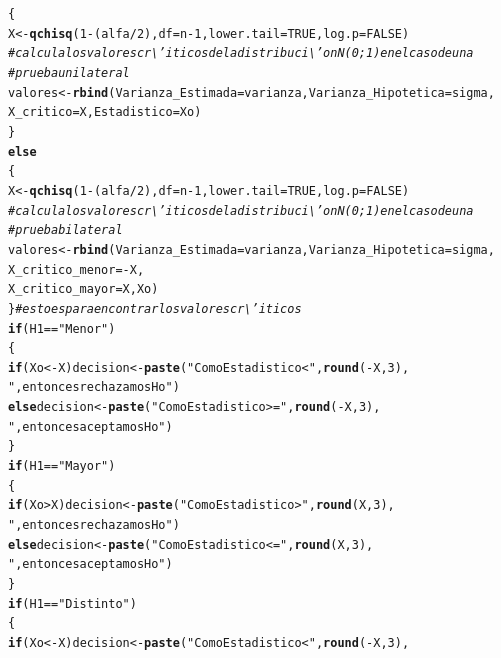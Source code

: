 \documentclass[12pt,letterpaper]{article}\usepackage[]{graphicx}\usepackage[]{color}
\makeatletter
\newcommand{\hlnum}[1]{\textcolor[rgb]{0.686,0.059,0.569}{#1}}%
\newcommand{\hlstr}[1]{\textcolor[rgb]{0.192,0.494,0.8}{#1}}%
\newcommand{\hlcom}[1]{\textcolor[rgb]{0.678,0.584,0.686}{\textit{#1}}}%
\newcommand{\hlopt}[1]{\textcolor[rgb]{0,0,0}{#1}}%
\newcommand{\hlstd}[1]{\textcolor[rgb]{0.345,0.345,0.345}{#1}}%
\newcommand{\hlkwa}[1]{\textcolor[rgb]{0.161,0.373,0.58}{\textbf{#1}}}%
\newcommand{\hlkwb}[1]{\textcolor[rgb]{0.69,0.353,0.396}{#1}}%
\newcommand{\hlkwc}[1]{\textcolor[rgb]{0.333,0.667,0.333}{#1}}%
\newcommand{\hlkwd}[1]{\textcolor[rgb]{0.737,0.353,0.396}{\textbf{#1}}}%
\newenvironment{kframe}{%
 \def\at@end@of@kframe{}%
 \ifinner\ifhmode%
  \def\at@end@of@kframe{\end{minipage}}%
  \begin{minipage}{\columnwidth}%
 \fi\fi%
 \def\FrameCommand##1{\hskip\@totalleftmargin \hskip-\fboxsep
 \colorbox{shadecolor}{##1}\hskip-\fboxsep
     \hskip-\linewidth \hskip-\@totalleftmargin \hskip\columnwidth}%
 \MakeFramed {\advance\hsize-\width
   \@totalleftmargin\z@ \linewidth\hsize
   \@setminipage}}%
 {\par\unskip\endMakeFramed%
 \at@end@of@kframe}
\newenvironment{knitrout}{}{} %
\makeatother
\begin{document}
\begin{knitrout}
\begin{kframe}
\begin{alltt}
\hlstd{\{}
  \hlstd{X} \hlkwb{<-} \hlkwd{qchisq}\hlstd{(}\hlnum{1}\hlopt{-}\hlstd{(alfa}\hlopt{/}\hlnum{2}\hlstd{),} \hlkwc{df}\hlstd{=n}\hlopt{-}\hlnum{1}\hlstd{,} \hlkwc{lower.tail} \hlstd{=} \hlnum{TRUE}\hlstd{,} \hlkwc{log.p} \hlstd{=} \hlnum{FALSE}\hlstd{)}
  \hlcom{# calcula los valores cr\textbackslash{}'iticos de la distribuci\textbackslash{}'on N(0;1) en el caso de una }
\hlcom{# prueba unilateral }
\hlstd{valores} \hlkwb{<-} \hlkwd{rbind}\hlstd{(}\hlkwc{Varianza_Estimada}\hlstd{= varianza,} \hlkwc{Varianza_Hipotetica}\hlstd{=sigma,}
                 \hlkwc{X_critico}\hlstd{=X,}\hlkwc{Estadistico}\hlstd{= Xo)}
\hlstd{\}}
\hlkwa{else}
\hlstd{\{}
\hlstd{X} \hlkwb{<-} \hlkwd{qchisq}\hlstd{(}\hlnum{1}\hlopt{-}\hlstd{(alfa}\hlopt{/}\hlnum{2}\hlstd{),} \hlkwc{df}\hlstd{=n}\hlopt{-}\hlnum{1}\hlstd{,} \hlkwc{lower.tail} \hlstd{=} \hlnum{TRUE}\hlstd{,} \hlkwc{log.p} \hlstd{=} \hlnum{FALSE}\hlstd{)}
\hlcom{# calcula los valores cr\textbackslash{}'iticos de la distribuci\textbackslash{}'on N(0;1) en el caso de una }
\hlcom{# prueba  bilateral }
\hlstd{valores} \hlkwb{<-} \hlkwd{rbind}\hlstd{(}\hlkwc{Varianza_Estimada}\hlstd{=varianza,} \hlkwc{Varianza_Hipotetica}\hlstd{=sigma,}
                 \hlkwc{X_critico_menor}\hlstd{=}\hlopt{-}\hlstd{X,}
\hlkwc{X_critico_mayor} \hlstd{=X, Xo)}
\hlstd{\}} \hlcom{# esto es para encontrar los valores cr\textbackslash{}'iticos }
\hlkwa{if} \hlstd{(H1} \hlopt{==} \hlstr{"Menor"}\hlstd{)}
\hlstd{\{}
 \hlkwa{if} \hlstd{(Xo} \hlopt{< -}\hlstd{X) decision} \hlkwb{<-} \hlkwd{paste}\hlstd{(}\hlstr{"Como Estadistico <"}\hlstd{,} \hlkwd{round}\hlstd{(}\hlopt{-}\hlstd{X,}\hlnum{3}\hlstd{),}
                                \hlstr{", entonces rechazamos Ho"}\hlstd{)}
 \hlkwa{else} \hlstd{decision} \hlkwb{<-} \hlkwd{paste}\hlstd{(}\hlstr{"Como Estadistico>="}\hlstd{,} \hlkwd{round}\hlstd{(}\hlopt{-}\hlstd{X,}\hlnum{3}\hlstd{),}
                        \hlstr{", entonces aceptamos Ho"}\hlstd{)}
\hlstd{\}}
\hlkwa{if} \hlstd{(H1} \hlopt{==} \hlstr{"Mayor"}\hlstd{)}
\hlstd{\{}
\hlkwa{if} \hlstd{(Xo} \hlopt{>} \hlstd{X) decision} \hlkwb{<-} \hlkwd{paste}\hlstd{(}\hlstr{"Como Estadistico >"}\hlstd{,} \hlkwd{round}\hlstd{(X,}\hlnum{3}\hlstd{),}
                              \hlstr{", entonces rechazamos Ho"}\hlstd{)}
\hlkwa{else} \hlstd{decision} \hlkwb{<-} \hlkwd{paste}\hlstd{(}\hlstr{"Como Estadistico <="}\hlstd{,} \hlkwd{round}\hlstd{(X,}\hlnum{3}\hlstd{),}
                       \hlstr{", entonces aceptamos Ho"}\hlstd{)}
\hlstd{\}}
\hlkwa{if} \hlstd{(H1} \hlopt{==} \hlstr{"Distinto"}\hlstd{)}
\hlstd{\{}
 \hlkwa{if} \hlstd{(Xo} \hlopt{< -}\hlstd{X) decision} \hlkwb{<-} \hlkwd{paste}\hlstd{(}\hlstr{"Como Estadistico <"}\hlstd{,} \hlkwd{round}\hlstd{(}\hlopt{-}\hlstd{X,}\hlnum{3}\hlstd{),}

\end{alltt}
\end{kframe}
\end{knitrout}
\end{document}
